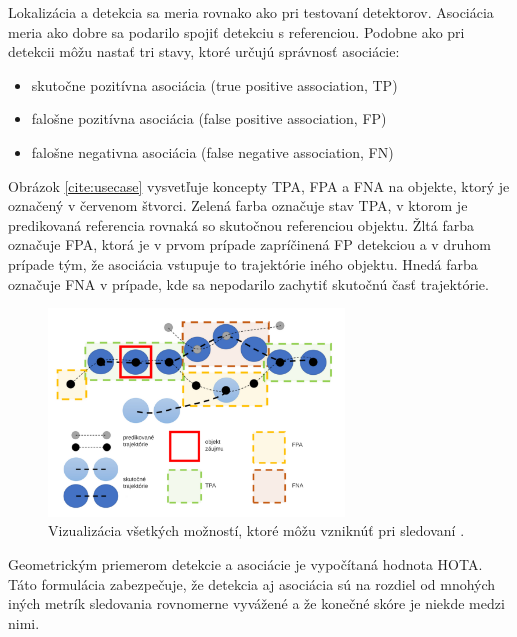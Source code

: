 Lokalizácia a detekcia sa meria rovnako ako pri testovaní detektorov. Asociácia meria ako dobre sa podarilo spojiť detekciu s referenciou. Podobne ako pri detekcii môžu nastať tri stavy, ktoré určujú správnosť asociácie:

\begin{itemize}
  \item skutočne pozitívna asociácia (true positive association, TP)
  \item falošne pozitívna asociácia (false positive association, FP)
  \item falošne negativna asociácia (false negative association, FN)
\end{itemize}


Obrázok \ref{cite:usecase} vysvetľuje koncepty TPA, FPA a FNA na objekte, ktorý je označený v červenom štvorci. Zelená farba označuje stav TPA, v ktorom je predikovaná referencia rovnaká so skutočnou referenciou objektu. Žltá farba označuje FPA, ktorá je v prvom prípade zapríčinená FP detekciou a v druhom prípade tým, že asociácia vstupuje to trajektórie iného objektu. Hnedá farba označuje FNA v prípade, kde sa nepodarilo zachytiť skutočnú časť trajektórie.

\begin{figure}[ht]
    \centering
    \includegraphics[width=0.7\textwidth]{images/05/usecase.png}
    \caption{Vizualizácia všetkých možností, ktoré môžu vzniknúť pri sledovaní \cite{hota}.}
    \label{img:usecase}
\end{figure}

Geometrickým priemerom detekcie a asociácie je vypočítaná hodnota HOTA. Táto formulácia zabezpečuje, že detekcia aj asociácia sú na rozdiel od mnohých iných metrík sledovania rovnomerne vyvážené a že konečné skóre je niekde medzi nimi.

